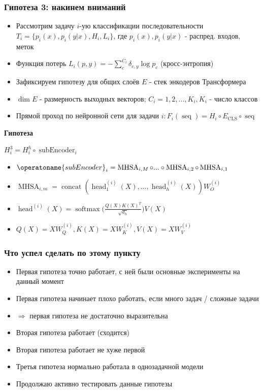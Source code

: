 \documentclass[aspectratio=169]{beamer}
\begin{document}
\begin{frame}
	\frametitle{Гипотеза 3: накинем вниманий}
	\begin{itemize}
		\item Рассмотрим задачу $i$-ую классификации последовательности $T_i = \{p_i(x), p_i(y | x), H_i, L_i\}$, где $p_i(x), p_i(y|x)$ - распред. входов, меток
		\item Функция потерь $L_i(p, y) = - \sum_{c}^{C_{i}} \delta_{c, y} \log p_c$ (кросс-энтропия)
		\item Зафиксируем гипотезу для общих слоёв $E$ - стек энкодеров Трансформера
		\item $\dim E$ - размерность выходных векторов; $C_i = {1, 2, ..., K_i}, K_i$ - число классов
		\item Прямой проход по нейронной сети для задачи $i: F_i(\operatorname{seq}) = H_i \circ E_{\operatorname{CLS}} \circ \operatorname{seq}$
	\end{itemize}

	\textbf{Гипотеза}

	$H_i^3 = H_{i}^{h} \circ \operatorname{subEncoder}_{i}$
	\begin{itemize}
		\item $\operatoname{subEncoder}_{i} = \operatorname{MHSA}_{i, M} \circ ... \circ \operatorname{MHSA}_{i, 2} \circ \operatorname{MHSA}_{i, 1}$
		\item $\operatorname{MHSA}_{i, m} = \operatorname{concat}(\operatorname{head}_1^{(i)}(X), ..., \operatorname{head}_h^{(i)}(X))W_{O}^{(i)}$
		\item $\operatorname{head}^{(i)}(X) = \operatorname{softmax} \Bigg ( \frac{Q(X)K(X)^T}{\sqrt{d_h}} \Bigg ) V(X)$
		\item $Q(X) = X W_{Q}^{(i)}, K(X) = X W_{K}^{(i)}, V(X) = X W_{V}^{(i)}$
	\end{itemize}
\end{frame}

\begin{frame}
	\frametitle{Что успел сделать по этому пункту}
	\begin{itemize}
		\item Первая гипотеза точно работает, с ней были основные эксперименты на данный момент
		\item Первая гипотеза начинает плохо работать, если много задач / сложные задачи
		\item $\Rightarrow$ первая гипотеза не достаточно выразительна
		\item Вторая гипотеза работает (сходится)
		\item Вторая гипотеза работает не хуже первой
		\item Третья гипотеза нормально работала в однозадачной модели
		\item Продолжаю активно тестировать данные гипотезы
	\end{itemize}
\end{frame}
\end{document}
